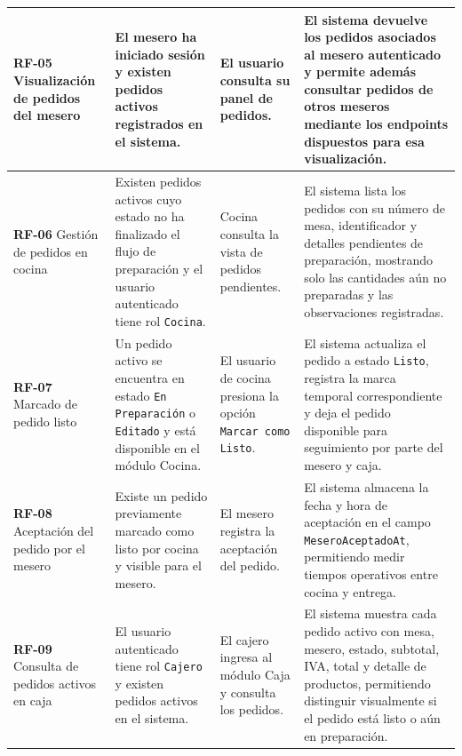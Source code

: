 \begin{longtable}{|p{2.4cm}|p{4cm}|p{4cm}|p{4.5cm}|}
	\textbf{RF-05} \newline Visualización de pedidos del mesero
	&
	El mesero ha iniciado sesión y existen pedidos activos registrados en el sistema.
	&
	El usuario consulta su panel de pedidos.
	&
	El sistema devuelve los pedidos asociados al mesero autenticado y permite además consultar pedidos de otros meseros mediante los endpoints dispuestos para esa visualización.
	\\
	\hline
	
	\textbf{RF-06} \newline Gestión de pedidos en cocina
	&
	Existen pedidos activos cuyo estado no ha finalizado el flujo de preparación y el usuario autenticado tiene rol \texttt{Cocina}.
	&
	Cocina consulta la vista de pedidos pendientes.
	&
	El sistema lista los pedidos con su número de mesa, identificador y detalles pendientes de preparación, mostrando solo las cantidades aún no preparadas y las observaciones registradas.
	\\
	\hline
	
	\textbf{RF-07} \newline Marcado de pedido listo
	&
	Un pedido activo se encuentra en estado \texttt{En Preparación} o \texttt{Editado} y está disponible en el módulo Cocina.
	&
	El usuario de cocina presiona la opción \texttt{Marcar como Listo}.
	&
	El sistema actualiza el pedido a estado \texttt{Listo}, registra la marca temporal correspondiente y deja el pedido disponible para seguimiento por parte del mesero y caja.
	\\
	\hline
	
	\textbf{RF-08} \newline Aceptación del pedido por el mesero
	&
	Existe un pedido previamente marcado como listo por cocina y visible para el mesero.
	&
	El mesero registra la aceptación del pedido.
	&
	El sistema almacena la fecha y hora de aceptación en el campo \texttt{MeseroAceptadoAt}, permitiendo medir tiempos operativos entre cocina y entrega.
	\\
	\hline
	
	\textbf{RF-09} \newline Consulta de pedidos activos en caja
	&
	El usuario autenticado tiene rol \texttt{Cajero} y existen pedidos activos en el sistema.
	&
	El cajero ingresa al módulo Caja y consulta los pedidos.
	&
	El sistema muestra cada pedido activo con mesa, mesero, estado, subtotal, IVA, total y detalle de productos, permitiendo distinguir visualmente si el pedido está listo o aún en preparación.
	\\
	\hline
	

\end{longtable}
